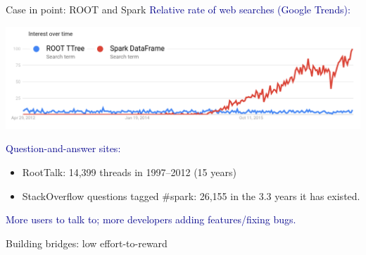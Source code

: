\documentclass{beamer}
\begin{document}
\begin{frame}{Case in point: ROOT and Spark}
\vfill
\textcolor{darkblue}{Relative rate of web searches (Google Trends):}

\includegraphics[width=\linewidth]{root-spark-google-trends.png}

\vfill
\textcolor{darkblue}{Question-and-answer sites:}
\begin{itemize}
\item RootTalk: 14,399 threads in 1997--2012 (15 years)
\item StackOverflow questions tagged \#spark: 26,155 in the 3.3 years it has existed.
\end{itemize}

\vfill
\textcolor{darkblue}{More users to talk to; more developers adding features/fixing bugs.}
\end{frame}

\begin{frame}{Building bridges: low effort-to-reward}
\vspace{0.5 cm}
\begin{center}
\hspace{1 cm}
\end{center}
\end{frame}
\end{document}
